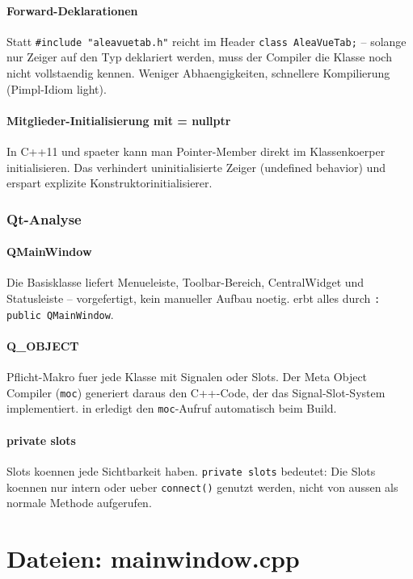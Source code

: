 \paragraph{Forward-Deklarationen}
Statt \verb|#include "aleavuetab.h"| reicht im Header
\verb|class AleaVueTab;| -- solange nur Zeiger auf den Typ
deklariert werden, muss der Compiler die Klasse noch nicht
vollstaendig kennen. Weniger Abhaengigkeiten, schnellere
Kompilierung (Pimpl-Idiom light).

\paragraph{Mitglieder-Initialisierung mit = nullptr}
In C++11 und spaeter kann man Pointer-Member direkt im
Klassenkoerper initialisieren. Das verhindert
uninitialisierte Zeiger (undefined behavior) und erspart
explizite Konstruktorinitialisierer.

\subsubsection{Qt-Analyse}

\paragraph{QMainWindow}
Die Basisklasse liefert Menueleiste, Toolbar-Bereich,
CentralWidget und Statusleiste -- vorgefertigt, kein
manueller Aufbau noetig.  erbt alles
durch \verb|: public QMainWindow|.

\paragraph{Q\_OBJECT}
Pflicht-Makro fuer jede Klasse mit Signalen oder Slots.
Der Meta Object Compiler (\texttt{moc}) generiert daraus
den C++-Code, der das Signal-Slot-System implementiert.
 in  erledigt den
\texttt{moc}-Aufruf automatisch beim Build.

\paragraph{private slots}
Slots koennen jede Sichtbarkeit haben. \verb|private slots|
bedeutet: Die Slots koennen nur intern oder ueber
\verb|connect()| genutzt werden, nicht von aussen als
normale Methode aufgerufen.

\section{Dateien: mainwindow.cpp}

